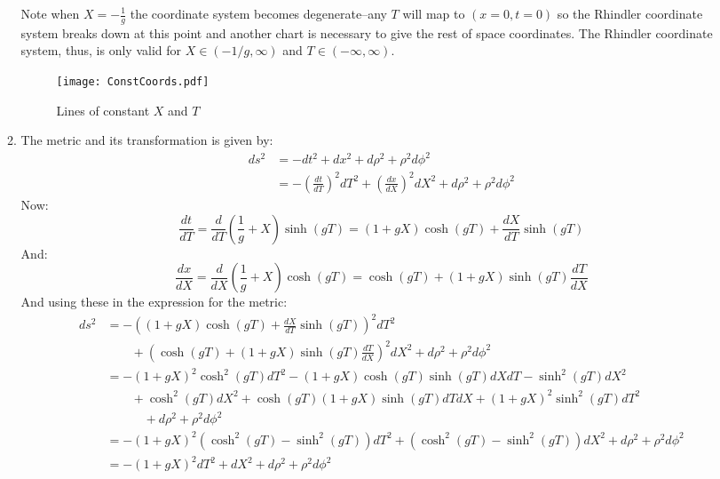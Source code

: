 \documentclass[12pt,a4]{article}
\begin{document}
\begin{enumerate}
\begin{enumerate}
        Note when $X = -\frac{1}{g}$ the coordinate system becomes degenerate--any $T$ will map to $(x = 0, t = 0)$ so the Rhindler coordinate system breaks down at this point and another chart is necessary to give the rest of space coordinates.
        The Rhindler coordinate system, thus, is only valid for $X \in (-1/g, \infty)$ and $T \in (-\infty, \infty)$.
        \begin{figure}[H]
          \centering
          \texttt{[image: ConstCoords.pdf]}
          \caption{Lines of constant $X$ and $T$}
          \label{fig:constCoords}
        \end{figure}
      \item 
        The metric and its transformation is given by:
        \begin{align*}
          ds^2 &= -dt^2 + dx^2 + d\rho^2 + \rho^2d\phi^2\\
               &= -\left(\frac{dt}{dT}\right)^2dT^2 + \left(\frac{dx}{dX}\right)^2 dX^2 + d\rho^2 + \rho^2d\phi^2
        \end{align*}
        Now:
        \begin{equation*}
          \frac{d t}{dT} = \frac{d}{dT} \left(\frac{1}{g} + X\right) \sinh(gT) = \left(1 + gX\right) \cosh(gT) + \frac{d X}{dT} \sinh(gT)
        \end{equation*}
        And:
        \begin{equation*}
          \frac{d x}{dX} = \frac{d}{dX} \left(\frac{1}{g} + X\right) \cosh(gT) =  \cosh(gT) + \left(1 + gX\right) \sinh(gT) \frac{dT}{dX}
        \end{equation*}
        And using these in the expression for the metric:
        \begin{align*}
          ds^2  &= -\left(\left(1 + gX\right) \cosh(gT) + \frac{d X}{dT} \sinh(gT)\right)^2dT^2\\
                &\qquad + \left(\cosh(gT) + \left(1 + gX\right) \sinh(gT) \frac{dT}{dX}\right)^2 dX^2 + d\rho^2 + \rho^2d\phi^2\\
                &= -\left(1 + gX\right)^2 \cosh^2(gT)dT^2 - \left(1 + gX\right) \cosh(gT) \sinh(gT)dXdT - \sinh^2(gT) dX^2\\
                &\qquad + \cosh^2(gT)dX^2 + \cosh(gT)\left(1 + gX\right) \sinh(gT) dT dX + \left(1 + gX\right)^2 \sinh^2(gT) dT^2\\
                &\qquad \quad + d\rho^2 + \rho^2d\phi^2\\
                &= -\left(1 + gX\right)^2 (\cosh^2(gT) - \sinh^2(gT))dT^2  + (\cosh^2(gT) - \sinh^2(gT)) dX^2 + d\rho^2 + \rho^2d\phi^2\\
                &= -\left(1 + gX\right)^2 dT^2  +  dX^2 + d\rho^2 + \rho^2d\phi^2
        \end{align*}
    \end{enumerate}


\end{enumerate}
\end{document}
